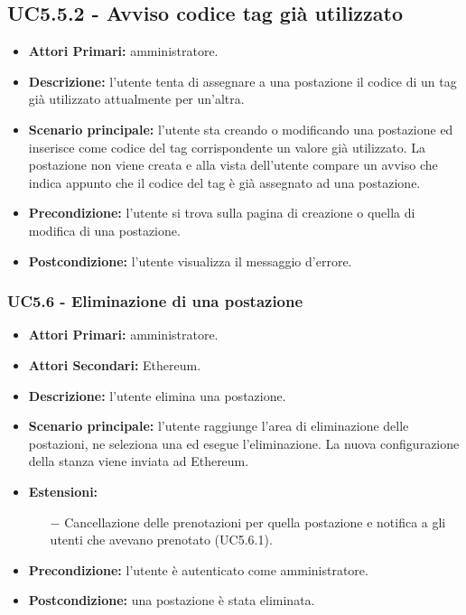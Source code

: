 \subsection{ UC5.5.2 - Avviso codice tag già utilizzato}
\begin{itemize}
	\item\textbf{Attori Primari:}
	amministratore.
	\item\textbf{Descrizione:}
	l'utente tenta di assegnare a una postazione il codice di un tag già utilizzato attualmente per un'altra.
	\item\textbf{Scenario principale:}
	l'utente sta creando o modificando una postazione ed inserisce come codice del tag corrispondente un valore già utilizzato.
	La postazione non viene creata e alla vista dell'utente compare un avviso che indica appunto che il codice del tag è già assegnato ad una postazione.
	\item\textbf{Precondizione:}
	l'utente si trova sulla pagina di creazione o quella di modifica di una postazione.
	\item\textbf{Postcondizione:}
	l'utente visualizza il messaggio d'errore.
\end{itemize}

\subsubsection{ UC5.6 - Eliminazione di una postazione}
\begin{itemize}
	\item\textbf{Attori Primari:}
	amministratore.
	\item\textbf{Attori Secondari:}
	Ethereum.
	\item\textbf{Descrizione:}
	l'utente elimina una postazione.
	\item\textbf{Scenario principale:} 
	l'utente raggiunge l'area di eliminazione delle postazioni, ne seleziona una ed esegue l'eliminazione. La nuova configurazione della stanza viene inviata ad Ethereum.
	\item\textbf{Estensioni:}
	\begin{itemize}
		\item[$-$] Cancellazione delle prenotazioni per quella postazione e notifica a gli utenti che avevano prenotato (UC5.6.1).
	\end{itemize}
	\item\textbf{Precondizione:} 
	l'utente è autenticato come amministratore.
	\item\textbf{Postcondizione:}
	una postazione è stata eliminata.
\end{itemize}

